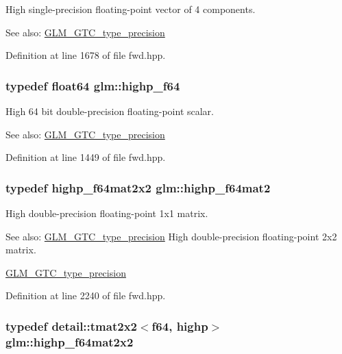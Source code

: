 High single-precision floating-point vector of 4 components. \begin{Desc}
\item[See also:]\hyperlink{group__gtc__type__precision}{GLM\_\-GTC\_\-type\_\-precision} \end{Desc}


Definition at line 1678 of file fwd.hpp.\hypertarget{group__gtc__type__precision_gb1306a5a8ae99fb2867b548b1546bbe0}{
\subsubsection[highp\_\-f64]{\setlength{\rightskip}{0pt plus 5cm}typedef float64 {\bf glm::highp\_\-f64}}}
\label{group__gtc__type__precision_gb1306a5a8ae99fb2867b548b1546bbe0}


High 64 bit double-precision floating-point scalar. \begin{Desc}
\item[See also:]\hyperlink{group__gtc__type__precision}{GLM\_\-GTC\_\-type\_\-precision} \end{Desc}


Definition at line 1449 of file fwd.hpp.\hypertarget{group__gtc__type__precision_g7d9fd446fd43310ba6f63c8f9468acc0}{
\subsubsection[highp\_\-f64mat2]{\setlength{\rightskip}{0pt plus 5cm}typedef highp\_\-f64mat2x2 {\bf glm::highp\_\-f64mat2}}}
\label{group__gtc__type__precision_g7d9fd446fd43310ba6f63c8f9468acc0}


High double-precision floating-point 1x1 matrix. \begin{Desc}
\item[See also:]\hyperlink{group__gtc__type__precision}{GLM\_\-GTC\_\-type\_\-precision} High double-precision floating-point 2x2 matrix. 

\hyperlink{group__gtc__type__precision}{GLM\_\-GTC\_\-type\_\-precision} \end{Desc}


Definition at line 2240 of file fwd.hpp.\hypertarget{group__gtc__type__precision_g4babca568fc88f185620c02e4fdac0d8}{
\subsubsection[highp\_\-f64mat2x2]{\setlength{\rightskip}{0pt plus 5cm}typedef detail::tmat2x2$<$f64, highp$>$ {\bf glm::highp\_\-f64mat2x2}}}
\label{group__gtc__type__precision_g4babca568fc88f185620c02e4fdac0d8}


